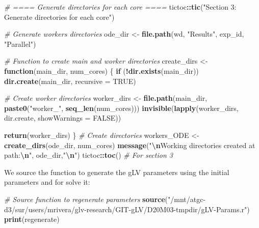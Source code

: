 \documentclass[
]{article}
\newenvironment{Shaded}{\begin{snugshade}}{\end{snugshade}}
\newcommand{\AttributeTok}[1]{\textcolor[rgb]{0.13,0.29,0.53}{#1}}
\newcommand{\CommentTok}[1]{\textcolor[rgb]{0.56,0.35,0.01}{\textit{#1}}}
\newcommand{\ConstantTok}[1]{\textcolor[rgb]{0.56,0.35,0.01}{#1}}
\newcommand{\ControlFlowTok}[1]{\textcolor[rgb]{0.13,0.29,0.53}{\textbf{#1}}}
\newcommand{\FunctionTok}[1]{\textcolor[rgb]{0.13,0.29,0.53}{\textbf{#1}}}
\newcommand{\NormalTok}[1]{#1}
\newcommand{\OtherTok}[1]{\textcolor[rgb]{0.56,0.35,0.01}{#1}}
\newcommand{\SpecialCharTok}[1]{\textcolor[rgb]{0.81,0.36,0.00}{\textbf{#1}}}
\newcommand{\StringTok}[1]{\textcolor[rgb]{0.31,0.60,0.02}{#1}}
\begin{document}
\begin{Shaded}
\begin{Highlighting}[]
\CommentTok{\# ==== Generate directories for each core ====}
\NormalTok{tictoc}\SpecialCharTok{::}\FunctionTok{tic}\NormalTok{(}\StringTok{"Section 3: Generate directories for each core"}\NormalTok{)}

\CommentTok{\# Generate workers directories}
\NormalTok{ode\_dir }\OtherTok{\textless{}{-}} \FunctionTok{file.path}\NormalTok{(wd, }\StringTok{"Results"}\NormalTok{, exp\_id, }\StringTok{"Parallel"}\NormalTok{)}

\CommentTok{\# Function to create main and worker directories}
\NormalTok{create\_dirs }\OtherTok{\textless{}{-}} \ControlFlowTok{function}\NormalTok{(main\_dir, num\_cores) \{}
  \ControlFlowTok{if}\NormalTok{ (}\SpecialCharTok{!}\FunctionTok{dir.exists}\NormalTok{(main\_dir)) }\FunctionTok{dir.create}\NormalTok{(main\_dir, }\AttributeTok{recursive =} \ConstantTok{TRUE}\NormalTok{)}
  
  \CommentTok{\# Create worker directories}
\NormalTok{  worker\_dirs }\OtherTok{\textless{}{-}} \FunctionTok{file.path}\NormalTok{(main\_dir, }\FunctionTok{paste0}\NormalTok{(}\StringTok{"worker\_"}\NormalTok{, }\FunctionTok{seq\_len}\NormalTok{(num\_cores)))}
  \FunctionTok{invisible}\NormalTok{(}\FunctionTok{lapply}\NormalTok{(worker\_dirs, dir.create, }\AttributeTok{showWarnings =} \ConstantTok{FALSE}\NormalTok{))}
  
  \FunctionTok{return}\NormalTok{(worker\_dirs)}
\NormalTok{\}}
\CommentTok{\# Create directories }
\NormalTok{workers\_ODE }\OtherTok{\textless{}{-}} \FunctionTok{create\_dirs}\NormalTok{(ode\_dir, num\_cores)}
\FunctionTok{message}\NormalTok{(}\StringTok{"}\SpecialCharTok{\textbackslash{}n}\StringTok{Working directories created at path:}\SpecialCharTok{\textbackslash{}n}\StringTok{"}\NormalTok{, ode\_dir,}\StringTok{"}\SpecialCharTok{\textbackslash{}n}\StringTok{"}\NormalTok{)}
\NormalTok{tictoc}\SpecialCharTok{::}\FunctionTok{toc}\NormalTok{() }\CommentTok{\# For section 3}
\end{Highlighting}
\end{Shaded}

We source the function to generate the gLV parameters using the initial
parameters and for solve it:

\begin{Shaded}
\begin{Highlighting}[]
\CommentTok{\# Source function to regenerate parameters}
\FunctionTok{source}\NormalTok{(}\StringTok{"/mnt/atgc{-}d3/sur/users/mrivera/glv{-}research/GIT{-}gLV/D20M03{-}tmpdir/gLV{-}Params.r"}\NormalTok{)}
\FunctionTok{print}\NormalTok{(regenerate)}
\end{Highlighting}
\end{Shaded}
\end{document}
